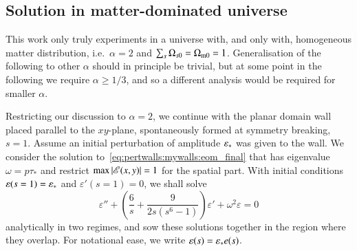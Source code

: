 


\subsection{Solution in matter-dominated universe}\label{sec:pertwalls:mywalls:sol_MD}
    This work only truly experiments in a universe with, and only with, homogeneous matter distribution, i.e.~$\alpha=2$ and $\sum_{s}\Omega_{s0}=\Omega_\mathrm{m0}=1$. Generalisation of the following to other $\alpha$ should in principle be trivial, but at some point in the following we require $\alpha\geq 1/3$, and so a different analysis would be required for smaller $\alpha$.

    Restricting our discussion to $\alpha=2$, we continue with the planar domain wall placed parallel to the $xy$-plane, spontaneously formed at symmetry breaking, $s=1$. Assume an initial perturbation of amplitude $\varepsilon_\ast$ was given to the wall. We consider the solution to~\cref{eq:pertwalls:mywalls:eom_final} that has eigenvalue $\omega=p\tau_\ast$ and restrict $\max{\abs{\mathscr{E}(x,y)}}=1$ for the spatial part.
    With initial conditions $\varepsilon(s=1)=\varepsilon_\ast$ and $\varepsilon'(s=1)=0$, we shall solve
    \begin{equation}\label{eq:pertwalls:mywalls:eom_eps_s_MD}
        \varepsilon'' + \left( \frac{6}{s}  +\frac{9}{2s\left(s^6-1\right)} \right) \varepsilon' + \omega^2 \varepsilon = 0
    \end{equation}
    analytically in two regimes, and sow these solutions together in the region where they overlap. For notational ease, we write $\varepsilon(s) = \varepsilon_\ast e(s)$.
    

